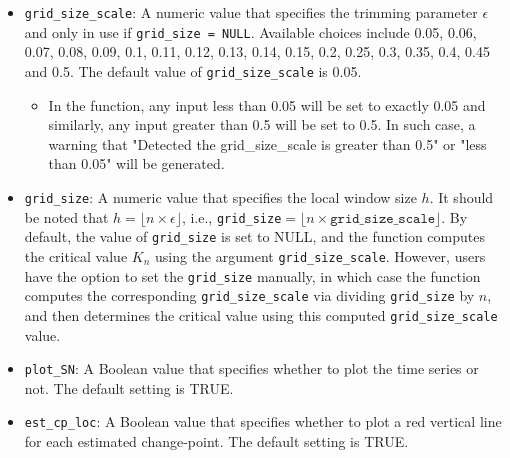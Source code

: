 \begin{itemize}
	\item \texttt{grid\_size\_scale}: A numeric value that specifies the trimming parameter $\epsilon$ and only in use if \texttt{grid\_size = NULL}. Available choices include  0.05, 0.06, 0.07, 0.08, 0.09, 0.1, 0.11, 0.12, 0.13, 0.14, 0.15, 0.2, 0.25, 0.3, 0.35, 0.4, 0.45 and 0.5.  The default value of \texttt{grid\_size\_scale} is 0.05.  
	\begin{itemize}
		\item In the function, any input less than 0.05 will be set to exactly 0.05 and similarly, any input greater than 0.5 will be set to 0.5. In such case, a warning that "Detected the grid\_size\_scale is greater than 0.5" or "less than 0.05" will be generated. 
	\end{itemize}
	
	\item \texttt{grid\_size}: A numeric value that specifies the local window size $h$. It should be noted that $h=\lfloor n\times\epsilon\rfloor$, i.e., \texttt{grid\_size}$= \lfloor n\times \texttt{grid\_size\_scale}\rfloor$. By default, the value of \texttt{grid\_size} is set to NULL, and the function computes the critical value $K_n$ using the argument \texttt{grid\_size\_scale}.  However, users have the option to set the \texttt{grid\_size} manually, in which case the function computes the corresponding \texttt{grid\_size\_scale} via dividing \texttt{grid\_size} by $n$, and then determines the critical value using this computed \texttt{grid\_size\_scale} value.
	
	\item \texttt{plot\_SN}: A Boolean value that specifies whether to plot the time series or not. The default setting is TRUE. 
	
	\item \texttt{est\_cp\_loc}: A Boolean value that specifies whether to plot a red vertical line for each estimated change-point. The default setting is TRUE.
\end{itemize}

